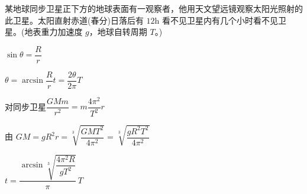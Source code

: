 \begin{problem}

某地球同步卫星正下方的地球表面有一观察者，他用天文望远镜观察太阳光照射的此卫星。太阳直射赤道(春分)日落后有 $12\mathrm{h}$ 看不见卫星内有几个小时看不见卫星。(地表重力加速度 $g$，地球自转周期 $T$。)%
\begin{solution}
$\sin\theta=\dfrac{R}{r}$\quad \struck{$\theta$}%

$\theta=\arcsin\dfrac{R}{r}$\quad $t=\dfrac{2\theta}{2\pi}T$

对同步卫星\quad $\dfrac{GMm}{r^2}=m\dfrac{4\pi^2}{T^2}r$

由 $GM=gR^2$\quad $r=\sqrt[3]{\dfrac{GMT^2}{4\pi^2}}=\sqrt[3]{\dfrac{gR^2T^2}{4\pi^2}}$

$t=\dfrac{\arcsin\sqrt[3]{\dfrac{4\pi^2R}{gT^2}}}{\pi}\,T$%
\end{solution}
\end{problem}

